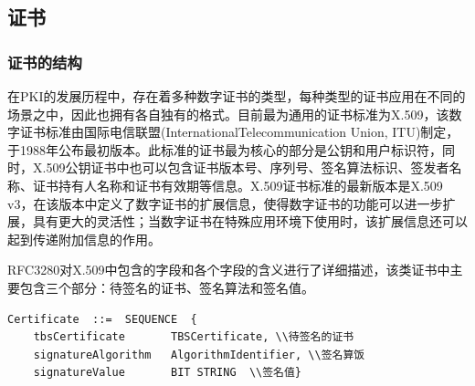 \subsection{证书}

\subsubsection{证书的结构}


在PKI的发展历程中，存在着多种数字证书的类型，每种类型的证书应用在不同的场景之中，因此也拥有各自独有的格式。目前最为通用的证书标准为X.509，该数字证书标准由国际电信联盟(InternationalTelecommunication Union, ITU)制定，于1988年公布最初版本。此标准的证书最为核心的部分是公钥和用户标识符，同时，X.509公钥证书中也可以包含证书版本号、序列号、签名算法标识、签发者名称、证书持有人名称和证书有效期等信息。X.509证书标准的最新版本是X.509 v3，在该版本中定义了数字证书的扩展信息，使得数字证书的功能可以进一步扩展，具有更大的灵活性；当数字证书在特殊应用环境下使用时，该扩展信息还可以起到传递附加信息的作用。

RFC3280\cite{housley1998internet}对X.509中包含的字段和各个字段的含义进行了详细描述，该类证书中主要包含三个部分：待签名的证书、签名算法和签名值。


\renewcommand{\lstlistingname}{代码}

\begin{lstlisting}[caption={X.509证书结构}]
Certificate  ::=  SEQUENCE  {
    tbsCertificate       TBSCertificate, \\待签名的证书
    signatureAlgorithm   AlgorithmIdentifier, \\签名算饭
    signatureValue       BIT STRING  \\签名值}

 \end{lstlisting}

